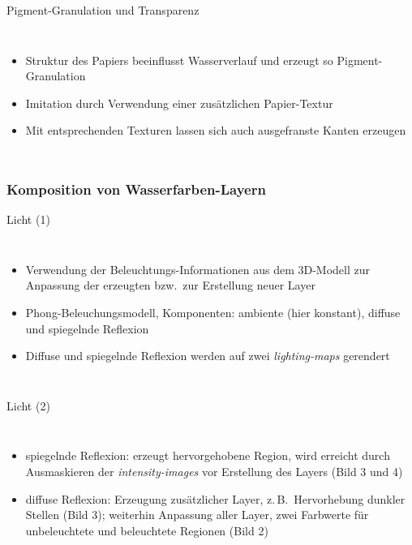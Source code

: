 \begin{frame}{Pigment-Granulation und Transparenz}
  \begin{columns}[t]
      \begin{itemize}
        \item Struktur des Papiers beeinflusst Wasserverlauf und erzeugt so Pigment-Granulation
        \item Imitation durch Verwendung einer zusätzlichen Papier-Textur
        \item Mit entsprechenden Texturen lassen sich auch ausgefranste Kanten erzeugen
      \end{itemize}
  \end{columns}
\end{frame}

\subsubsection{Komposition von Wasserfarben-Layern}
\begin{frame}{Licht (1)}
  \begin{columns}
      \begin{itemize}
        \item Verwendung der Beleuchtungs-Informationen aus dem 3D-Modell zur
        Anpassung der erzeugten bzw.\ zur Erstellung neuer Layer
        \item Phong-Beleuchungsmodell, Komponenten: ambiente (hier konstant), 
        diffuse und spiegelnde Reflexion
        \item Diffuse und spiegelnde Reflexion werden auf zwei \textsl{lighting-maps} gerendert
      \end{itemize}
  \end{columns}
\end{frame}

\begin{frame}{Licht (2)}
  \begin{columns}
      \begin{itemize}
        \item spiegelnde Reflexion: erzeugt hervorgehobene Region, wird erreicht
        durch Ausmaskieren der \textsl{intensity-images} vor Erstellung des
        Layers (Bild 3 und 4)
        \item diffuse Reflexion: Erzeugung zusätzlicher Layer, z.\,B.\
        Hervorhebung dunkler Stellen (Bild 3); weiterhin Anpassung aller Layer,
        zwei Farbwerte für unbeleuchtete und beleuchtete Regionen (Bild 2)
      \end{itemize}
  \end{columns}
\end{frame}


